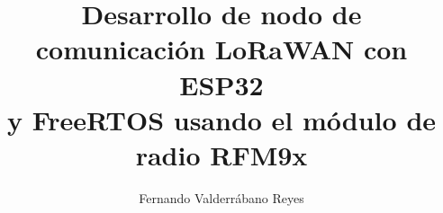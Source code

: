 \documentclass[12pt]{uaztesis}
\numberwithin{listing}{chapter}
\begin{document}
\thesism %

 \hyphenation{}

 \clearpage{}


    \title{Desarrollo de nodo de comunicación LoRaWAN con ESP32 \\ y FreeRTOS usando el módulo de radio RFM9x}
\author{Fernando Valderrábano Reyes}

 
 
 


\date{\the\year{}}


 \maketitle





\begin{resumen}
  
\end{resumen}

\begin{dedicatoria}
  
\end{dedicatoria}

\begin{agradecimientos}
  
\end{agradecimientos}

\tableofcontents
\listoffigures
\listoftables
\end{document}
